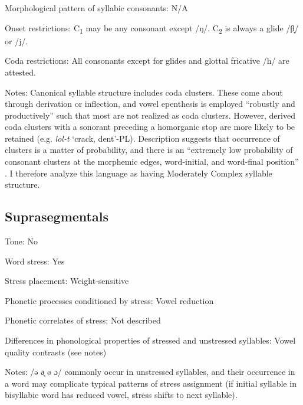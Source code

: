 {\begin{appendixdesc}
\item[Morphological pattern of syllabic consonants:] N/A

\item[Onset restrictions:] C\textsubscript{1} may be any consonant except /ŋ/. C\textsubscript{2} is always a glide /β̞/ or /j/.

\item[Coda restrictions:] All consonants except for glides and glottal fricative /h/ are attested. 

\item[Notes:] Canonical syllable structure includes coda clusters. These come about through derivation or inflection, and vowel epenthesis is employed “robustly and productively” such that most are not realized as coda clusters. However, derived coda clusters with a sonorant preceding a homorganic stop are more likely to be retained (e.g. \textit{lol-t} ‘crack, dent’-PL). Description suggests that occurrence of clusters is a matter of probability, and there is an “extremely low probability of consonant clusters at the morphemic edges, word-initial, and word-final position” \citep[55]{Filchenko2007}. I therefore analyze this language as having Moderately Complex syllable structure.
\end{appendixdesc}
\subsection*{Suprasegmentals}
\begin{appendixdesc}
\item[Tone:] No

\item[Word stress:] Yes

\item[Stress placement:] Weight-sensitive

\item[Phonetic processes conditioned by stress:] Vowel reduction

\item[Phonetic correlates of stress:] Not described

\item[Differences in phonological properties of stressed and unstressed syllables:] Vowel quality contrasts (see notes)

\item[Notes:] /ə ə̘ ø ɔ/ commonly occur in unstressed syllables, and their occurrence in a word may complicate typical patterns of stress assignment (if initial syllable in bisyllabic word has reduced vowel, stress shifts to next syllable).
\end{appendixdesc}
}
